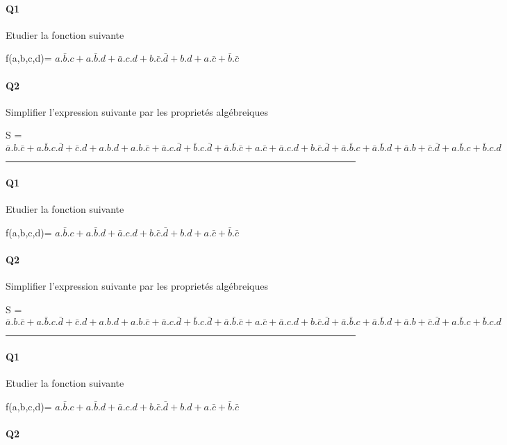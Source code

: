 \paragraph{Q1}

Etudier la fonction suivante

f(a,b,c,d)= $a.\bar b.c+a.\bar b.d+\bar a.c.d+b.\bar c.\bar d + b.d+a.\bar c+\bar b.\bar c$

\paragraph{Q2}

Simplifier l'expression suivante par les proprietés algébreiques 

S = $\bar a.b.\bar c+a.\bar b.c.\bar d + \bar c.d+a.b.d+a.b.\bar c+\bar a.c.\bar d+\bar b.c.\bar d+\bar a.\bar b.\bar c + a.\bar c+\bar a.c.d+b.\bar c.\bar d+\bar a.\bar b.c+\bar a.\bar b.d + \bar a.b+\bar c.\bar d+a.\bar b.c+\bar b.c.d$

\hrule width 1\linewidth
\paragraph{Q1}

Etudier la fonction suivante

f(a,b,c,d)= $a.\bar b.c+a.\bar b.d+\bar a.c.d+b.\bar c.\bar d + b.d+a.\bar c+\bar b.\bar c$

\paragraph{Q2}

Simplifier l'expression suivante par les proprietés algébreiques 

S = $\bar a.b.\bar c+a.\bar b.c.\bar d + \bar c.d+a.b.d+a.b.\bar c+\bar a.c.\bar d+\bar b.c.\bar d+\bar a.\bar b.\bar c + a.\bar c+\bar a.c.d+b.\bar c.\bar d+\bar a.\bar b.c+\bar a.\bar b.d + \bar a.b+\bar c.\bar d+a.\bar b.c+\bar b.c.d$

\hrule width 1\linewidth
\paragraph{Q1}

Etudier la fonction suivante

f(a,b,c,d)= $a.\bar b.c+a.\bar b.d+\bar a.c.d+b.\bar c.\bar d + b.d+a.\bar c+\bar b.\bar c$

\paragraph{Q2}

